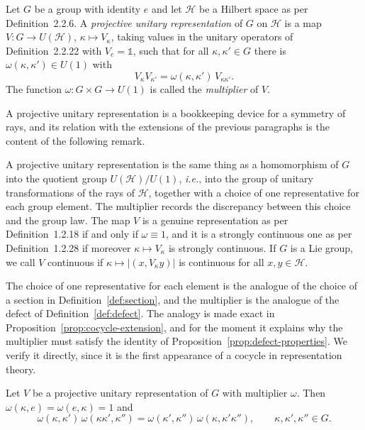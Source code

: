 \begin{definition}\label{def:projective-representation}
	Let $G$ be a group with identity $e$ and let $\mathcal{H}$ be a Hilbert space as per Definition~2.2.6. A \emph{projective unitary representation} of $G$ on $\mathcal{H}$ is a map $V:G\to U(\mathcal{H})$, $\kappa\mapsto V_\kappa$, taking values in the unitary operators of Definition~2.2.22 with $V_e=\mathbb{1}$, such that for all $\kappa,\kappa'\in G$ there is $\omega(\kappa,\kappa')\in U(1)$ with
	\begin{equation*}
		V_\kappa V_{\kappa'}=\omega(\kappa,\kappa')\,V_{\kappa\kappa'}.
	\end{equation*}
	The function $\omega:G\times G\to U(1)$ is called the \emph{multiplier} of $V$.
\end{definition}

A projective unitary representation is a bookkeeping device for a symmetry of rays, and its relation with the extensions of the previous paragraphs is the content of the following remark.

\begin{remark}\label{rem:projective-quotient}
	A projective unitary representation is the same thing as a homomorphism of $G$ into the quotient group $U(\mathcal{H})/U(1)$, \textit{i.e.}, into the group of unitary transformations of the rays of $\mathcal{H}$, together with a choice of one representative for each group element. The multiplier records the discrepancy between this choice and the group law. The map $V$ is a genuine representation as per Definition~1.2.18 if and only if $\omega\equiv1$, and it is a strongly continuous one as per Definition~1.2.28 if moreover $\kappa\mapsto V_\kappa$ is strongly continuous. If $G$ is a Lie group, we call $V$ continuous if $\kappa\mapsto|(x,V_\kappa y)|$ is continuous for all $x,y\in\mathcal{H}$.
\end{remark}

The choice of one representative for each element is the analogue of the choice of a section in Definition~\ref{def:section}, and the multiplier is the analogue of the defect of Definition~\ref{def:defect}. The analogy is made exact in Proposition~\ref{prop:cocycle-extension}, and for the moment it explains why the multiplier must satisfy the identity of Proposition~\ref{prop:defect-properties}. We verify it directly, since it is the first appearance of a cocycle in representation theory.

\begin{proposition}\label{prop:multiplier-cocycle}
	Let $V$ be a projective unitary representation of $G$ with multiplier $\omega$. Then $\omega(\kappa,e)=\omega(e,\kappa)=1$ and
	\begin{equation}\label{eq:multiplier-identity}
		\omega(\kappa,\kappa')\,\omega(\kappa\kappa',\kappa'')=\omega(\kappa',\kappa'')\,\omega(\kappa,\kappa'\kappa''), \qquad \kappa,\kappa',\kappa''\in G.
	\end{equation}
\end{proposition}

